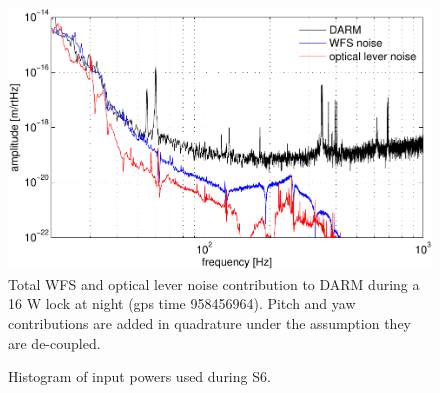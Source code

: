 \begin{figure}
\begin{centering}
\includegraphics[width=1.0\columnwidth]{figures/ASC2DARM.pdf}
\caption[]{Total WFS and optical lever noise contribution to DARM
  during a 16 W lock at night (gps time 958456964). Pitch and yaw
  contributions are added in quadrature under the assumption they are
  de-coupled.}
\label{fig:}
\end{centering}
\end{figure}



\begin{figure}
\begin{centering}
\caption[Histogram of input powers
  used during S6]{Histogram of input powers
  used during S6.}
\label{fig:}
\end{centering}
\end{figure}



